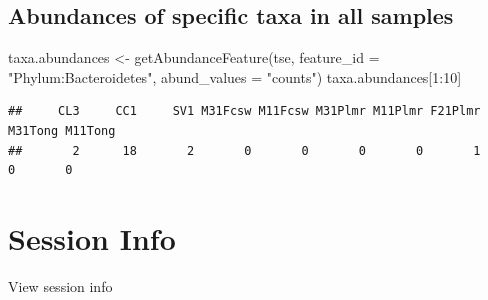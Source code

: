 \documentclass[
]{book}
\newenvironment{Shaded}{\begin{snugshade}}{\end{snugshade}}
\newcommand{\AttributeTok}[1]{\textcolor[rgb]{0.77,0.63,0.00}{#1}}
\newcommand{\DecValTok}[1]{\textcolor[rgb]{0.00,0.00,0.81}{#1}}
\newcommand{\FunctionTok}[1]{\textcolor[rgb]{0.00,0.00,0.00}{#1}}
\newcommand{\NormalTok}[1]{#1}
\newcommand{\OtherTok}[1]{\textcolor[rgb]{0.56,0.35,0.01}{#1}}
\newcommand{\SpecialCharTok}[1]{\textcolor[rgb]{0.00,0.00,0.00}{#1}}
\newcommand{\StringTok}[1]{\textcolor[rgb]{0.31,0.60,0.02}{#1}}
\begin{document}
\hypertarget{abundances-of-specific-taxa-in-all-samples}{%
\subsection{Abundances of specific taxa in all samples}\label{abundances-of-specific-taxa-in-all-samples}}

\begin{Shaded}
\begin{Highlighting}[]
\NormalTok{taxa.abundances }\OtherTok{\textless{}{-}} \FunctionTok{getAbundanceFeature}\NormalTok{(tse, }
                                      \AttributeTok{feature\_id =} \StringTok{"Phylum:Bacteroidetes"}\NormalTok{,}
                                      \AttributeTok{abund\_values =} \StringTok{"counts"}\NormalTok{)}
\NormalTok{taxa.abundances[}\DecValTok{1}\SpecialCharTok{:}\DecValTok{10}\NormalTok{]}
\end{Highlighting}
\end{Shaded}

\begin{verbatim}
##     CL3     CC1     SV1 M31Fcsw M11Fcsw M31Plmr M11Plmr F21Plmr M31Tong M11Tong 
##       2      18       2       0       0       0       0       1       0       0
\end{verbatim}

\hypertarget{session-info-3}{%
\section*{Session Info}\label{session-info-3}}

View session info
\end{document}
